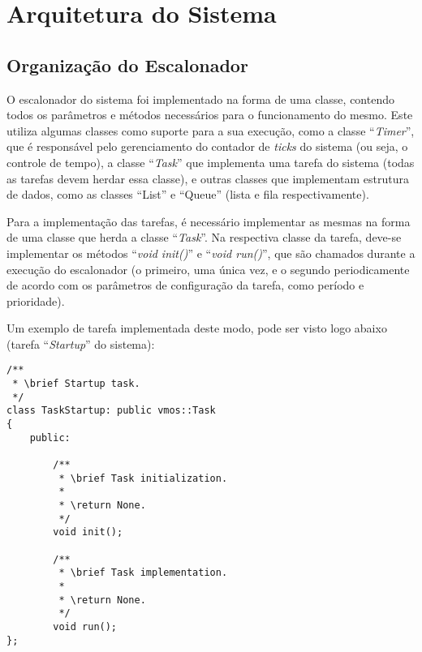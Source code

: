 %
%
%
%
%

%
%
%
%
%

\section{Arquitetura do Sistema} \label{sec:architecture}

\subsection{Organização do Escalonador}

O escalonador do sistema foi implementado na forma de uma classe, contendo todos os parâmetros e métodos necessários para o funcionamento do mesmo. Este utiliza algumas classes como suporte para a sua execução, como a classe ``\textit{Timer}'', que é responsável pelo gerenciamento do contador de \textit{ticks} do sistema (ou seja, o controle de tempo), a classe ``\textit{Task}'' que implementa uma tarefa do sistema (todas as tarefas devem herdar essa classe), e outras classes que implementam estrutura de dados, como as classes ``List'' e ``Queue'' (lista e fila respectivamente).

Para a implementação das tarefas, é necessário implementar as mesmas na forma de uma classe que herda a classe ``\textit{Task}''. Na respectiva classe da tarefa, deve-se implementar os métodos ``\textit{void init()}'' e ``\textit{void run()}'', que são chamados durante a execução do escalonador (o primeiro, uma única vez, e o segundo periodicamente de acordo com os parâmetros de configuração da tarefa, como período e prioridade).

Um exemplo de tarefa implementada deste modo, pode ser visto logo abaixo (tarefa ``\textit{Startup}'' do sistema):

\begin{lstlisting}
/**
 * \brief Startup task.
 */
class TaskStartup: public vmos::Task
{
    public:

        /**
         * \brief Task initialization.
         *
         * \return None.
         */
        void init();

        /**
         * \brief Task implementation.
         *
         * \return None.
         */
        void run();
};
\end{lstlisting}


